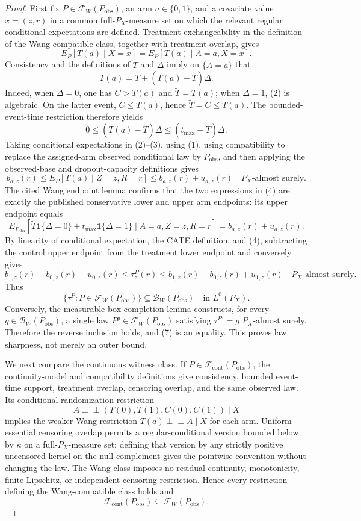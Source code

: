 \documentclass{article}
\begin{document}
\begin{proof}
First fix \(P\in\mathcal F_W(P_{\mathrm{obs}})\), an arm \(a\in\{0,1\}\), and a covariate value \(x=(z,r)\) in a common full-\(P_X\)-measure set on which the relevant regular conditional expectations are defined.  Treatment exchangeability in the definition of the Wang-compatible class, together with treatment overlap, gives
\[
E_P[T(a)\mid X=x]
=E_P[T(a)\mid A=a,X=x].
\tag{1}
\]
Consistency and the definitions of \(\widetilde T\) and \(\Delta\) imply on \(\{A=a\}\) that
\[
T(a)=\widetilde T+(T(a)-\widetilde T)\Delta.
\tag{2}
\]
Indeed, when \(\Delta=0\), one has \(C>T(a)\) and \(\widetilde T=T(a)\); when \(\Delta=1\), (2) is algebraic.  On the latter event, \(C\le T(a)\), hence \(\widetilde T=C\le T(a)\).  The bounded-event-time restriction therefore yields
\[
0\le (T(a)-\widetilde T)\Delta
\le (t_{\max}-\widetilde T)\Delta.
\tag{3}
\]
Taking conditional expectations in (2)--(3), using (1), using compatibility to replace the assigned-arm observed conditional law by \(P_{\mathrm{obs}}\), and then applying the observed-base and dropout-capacity definitions gives
\[
b_{a,z}(r)
\le E_P[T(a)\mid Z=z,R=r]
\le b_{a,z}(r)+u_{a,z}(r)
\quad P_X\text{-almost surely}.
\tag{4}
\]
The cited Wang endpoint lemma confirms that the two expressions in (4) are exactly the published conservative lower and upper arm endpoints: its upper endpoint equals
\[
E_{P_{\mathrm{obs}}}
[\widetilde T\mathbf 1\{\Delta=0\}+t_{\max}\mathbf 1\{\Delta=1\}
\mid A=a,Z=z,R=r]
=b_{a,z}(r)+u_{a,z}(r).
\tag{5}
\]
By linearity of conditional expectation, the CATE definition, and (4), subtracting the control upper endpoint from the treatment lower endpoint and conversely gives
\[
b_{1,z}(r)-b_{0,z}(r)-u_{0,z}(r)
\le\tau_z^P(r)\le
b_{1,z}(r)-b_{0,z}(r)+u_{1,z}(r)
\quad P_X\text{-almost surely}.
\tag{6}
\]
Thus
\[
\{\tau^P:P\in\mathcal F_W(P_{\mathrm{obs}})\}
\subseteq\mathcal B_W(P_{\mathrm{obs}})
\quad\text{in }L^0(P_X).
\tag{7}
\]
Conversely, the measurable-box-completion lemma constructs, for every \(g\in\mathcal B_W(P_{\mathrm{obs}})\), a single law \(P^g\in\mathcal F_W(P_{\mathrm{obs}})\) satisfying \(\tau^{P^g}=g\) \(P_X\)-almost surely.  Therefore the reverse inclusion holds, and (7) is an equality.  This proves law sharpness, not merely an outer bound.

We next compare the continuous witness class.  If \(P\in\mathcal F_{\mathrm{cont}}(P_{\mathrm{obs}})\), the continuity-model and compatibility definitions give consistency, bounded event-time support, treatment overlap, censoring overlap, and the same observed law.  Its conditional randomization restriction
\[
A\perp\!\!\!\perp(T(0),T(1),C(0),C(1))\mid X
\]
implies the weaker Wang restriction \(T(a)\perp\!\!\!\perp A\mid X\) for each arm.  Uniform essential censoring overlap permits a regular-conditional version bounded below by \(\kappa\) on a full-\(P_X\)-measure set; defining that version by any strictly positive uncensored kernel on the null complement gives the pointwise convention without changing the law.  The Wang class imposes no residual continuity, monotonicity, finite-Lipschitz, or independent-censoring restriction.  Hence every restriction defining the Wang-compatible class holds and
\[
\mathcal F_{\mathrm{cont}}(P_{\mathrm{obs}})
\subseteq\mathcal F_W(P_{\mathrm{obs}}).
\tag{8}
\]


\end{proof}
\end{document}
